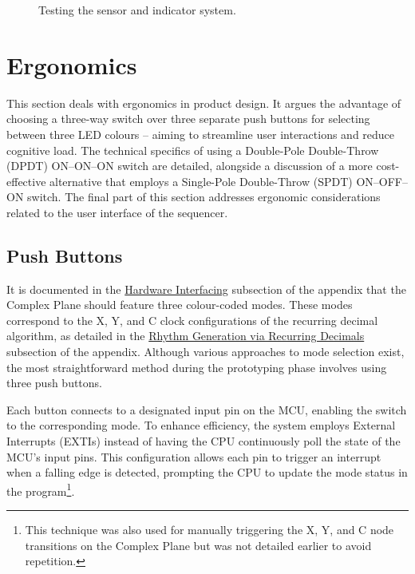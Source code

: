 \documentclass[12pt]{article}
\numberwithin{subsubsubsection}{subsubsection}
\begin{document}
\begin{figure}[H]
    \centering
    \caption{Testing the sensor and indicator system.}
    \label{fig:system_test}
\end{figure}















\newpage

\section{Ergonomics}

This section deals with ergonomics in product design. It argues the advantage of choosing a three-way switch over three separate push buttons for selecting between three LED colours – aiming to streamline user interactions and reduce cognitive load. The technical specifics of using a Double-Pole Double-Throw (DPDT) ON–ON–ON switch are detailed, alongside a discussion of a more cost-effective alternative that employs a Single-Pole Double-Throw (SPDT) ON–OFF–ON switch. The final part of this section addresses ergonomic considerations related to the user interface of the sequencer.


\subsection{Push Buttons}

It is documented in the \hyperref[appendix:hardwareinterfacing]{Hardware Interfacing} subsection of the appendix that the Complex Plane should feature three colour-coded modes. These modes correspond to the X, Y, and C clock configurations of the recurring decimal algorithm, as detailed in the \hyperref[appendix:recurringdecimals]{Rhythm Generation via Recurring Decimals} subsection of the appendix. Although various approaches to mode selection exist, the most straightforward method during the prototyping phase involves using three push buttons.

Each button connects to a designated input pin on the MCU, enabling the switch to the corresponding mode. To enhance efficiency, the system employs External Interrupts (EXTIs) instead of having the CPU continuously poll the state of the MCU's input pins. This configuration allows each pin to trigger an interrupt when a falling edge is detected, prompting the CPU to update the mode status in the program\footnote{This technique was also used for manually triggering the X, Y, and C node transitions on the Complex Plane but was not detailed earlier to avoid repetition.}. 
\end{document}
